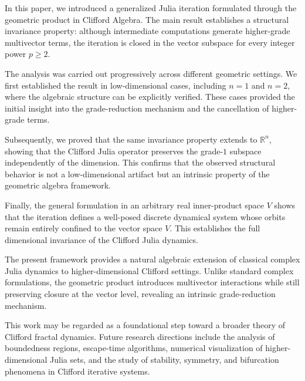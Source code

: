 \documentclass{amsart}
\theoremstyle{plain}
\numberwithin{equation}{section}
\begin{document}
In this paper, we introduced a generalized Julia iteration formulated
through the geometric product in Clifford Algebra. The main result
establishes a structural invariance property: although intermediate
computations generate higher-grade multivector terms, the iteration
is closed in the vector subspace for every integer power $p\ge2$.

The analysis was carried out progressively across different geometric
settings. We first established the result in low-dimensional cases,
including $n=1$ and $n=2$, where the algebraic structure can be
explicitly verified. These cases provided the initial insight into the
grade-reduction mechanism and the cancellation of higher-grade terms.

Subsequently, we proved that the same invariance property extends to
$\mathbb{R}^n$, showing that the Clifford Julia operator preserves the
grade-$1$ subspace independently of the dimension. This confirms that
the observed structural behavior is not a low-dimensional artifact but
an intrinsic property of the geometric algebra framework.

Finally, the general formulation in an arbitrary real inner-product
space $V$ shows that the iteration defines a well-posed discrete
dynamical system whose orbits remain entirely confined to the
vector space $V$. This establishes the full dimensional invariance
of the Clifford Julia dynamics.

The present framework provides a natural algebraic extension of
classical complex Julia dynamics to higher-dimensional Clifford
settings. Unlike standard complex formulations, the geometric product
introduces multivector interactions while still preserving closure at
the vector level, revealing an intrinsic grade-reduction mechanism.

This work may be regarded as a foundational step toward a broader
theory of Clifford fractal dynamics. Future research directions
include the analysis of boundedness regions, escape-time algorithms,
numerical visualization of higher-dimensional Julia sets, and the
study of stability, symmetry, and bifurcation phenomena in Clifford
iterative systems.
\end{document}
